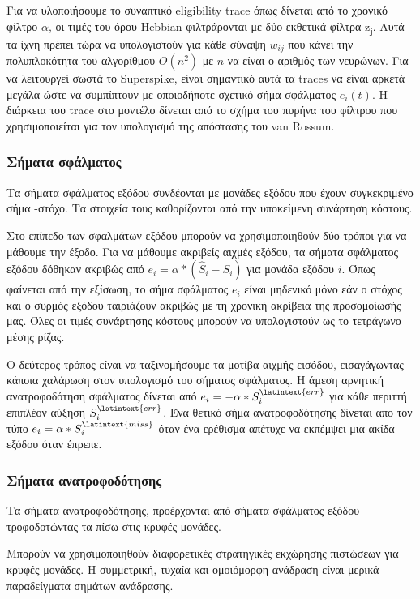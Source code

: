 \documentclass[12pt]{report}
\begin{document}
Για να υλοποιήσουμε το συναπτικό \textlatin{eligibility trace} όπως δίνεται από το χρονικό φίλτρο $\alpha$, οι τιμές του όρου \textlatin{Hebbian} φιλτράρονται με δύο εκθετικά φίλτρα z\textsubscript{\textlatin{j}}. Aυτά τα ίχνη πρέπει τώρα να υπολογιστούν για κάθε σύναψη $w_{i j}$  που κάνει την πολυπλοκότητα του αλγορίθμου $O\left(n^{2}\right)$ με $n$ να είναι ο αριθμός των νευρώνων. Για να λειτουργεί σωστά το \textlatin{Superspike}, είναι σημαντικό αυτά τα \textlatin{traces} να είναι αρκετά μεγάλα ώστε να συμπίπτουν με οποιοδήποτε σχετικό σήμα σφάλματος $e_{i}(t)$. Η διάρκεια του \textlatin{trace} στο μοντέλο δίνεται από το σχήμα του πυρήνα του φίλτρου που χρησιμοποιείται για τον υπολογισμό της απόστασης του \textlatin{van Rossum}.

\subsubsection{Σήματα σφάλματος}
Τα σήματα σφάλματος εξόδου συνδέονται με μονάδες εξόδου που έχουν συγκεκριμένο σήμα -στόχο. Τα στοιχεία τους καθορίζονται από την υποκείμενη συνάρτηση κόστους.

Στο επίπεδο των σφαλμάτων εξόδου μπορούν να χρησιμοποιηθούν δύο τρόποι για να μάθουμε την έξοδο. Για να μάθουμε ακριβείς αιχμές εξόδου, τα σήματα σφάλματος εξόδου δόθηκαν ακριβώς από $e_{i}=\alpha *\left(\hat{S}_{i}-S_{i}\right)$  για μονάδα εξόδου $i$. Όπως φαίνεται από την εξίσωση, το σήμα σφάλματος $e_{i}$ είναι μηδενικό μόνο εάν ο στόχος και ο συρμός εξόδου ταιριάζουν ακριβώς με τη χρονική ακρίβεια της προσομοίωσής μας. Όλες οι τιμές συνάρτησης κόστους μπορούν να υπολογιστούν ως το τετράγωνο μέσης ρίζας.

Ο δεύτερος τρόπος είναι να ταξινομήσουμε τα μοτίβα αιχμής εισόδου, εισαγάγωντας κάποια χαλάρωση στον υπολογισμό του σήματος σφάλματος. Η άμεση αρνητική ανατροφοδότηση σφάλματος δίνεται από $e_{i}=-\alpha * S_{i}^{\latintext {err }}$ για κάθε περιττή επιπλέον αύξηση $S_{i}^{\latintext {err }}$. Ένα θετικό σήμα ανατροφοδότησης δίνεται απο τον τύπο $e_{i}=\alpha * S_{i}^{\latintext {miss }}$ όταν ένα ερέθισμα απέτυχε να εκπέμψει μια ακίδα εξόδου όταν έπρεπε.

\subsubsection{Σήματα ανατροφοδότησης}
Τα σήματα ανατροφοδότησης, προέρχονται από σήματα σφάλματος εξόδου τροφοδοτώντας τα πίσω στις κρυφές μονάδες.

Μπορούν να χρησιμοποιηθούν διαφορετικές στρατηγικές εκχώρησης πιστώσεων για κρυφές μονάδες. Η συμμετρική, τυχαία και ομοιόμορφη ανάδραση είναι μερικά παραδείγματα σημάτων ανάδρασης.
\end{document}
